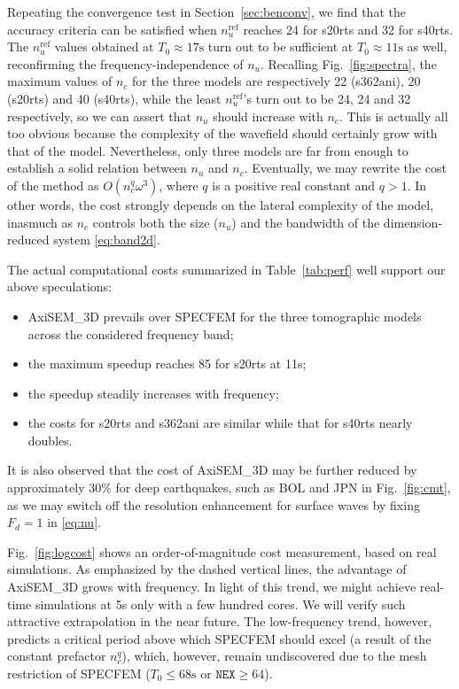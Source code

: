 \documentclass[extra,referee]{gji}
\begin{document}
Repeating the convergence test in Section~\ref{sec:benconv},
we find that the accuracy criteria can be satisfied when 
$n_u^\text{ref}$ reaches 24 for s20rts and 32 for s40rts.
The $n_u^\text{ref}$ values obtained at $T_0\approx17\text{s}$ turn out to be 
sufficient at $T_0\approx11\text{s}$ as well, reconfirming the 
frequency-independence of $n_u$.
Recalling Fig.~\ref{fig:spectra},
the maximum values of $n_c$ for the three models are respectively 
22 (s362ani), 20 (s20rts) and 40 (s40rts), while
the least $n_u^\text{ref}$'s turn out to be 24, 24 and 32 respectively,
so we can assert that $n_u$ should increase with $n_c$. 
This is actually all too obvious
because the complexity of the wavefield should certainly
grow with that of the model.
Nevertheless, only three models are far from enough to establish 
a solid relation between $n_u$ and $n_c$.
Eventually, we may rewrite the cost of the method as 
$O\left(n_c^q \omega^3\right)$, where $q$ is a positive real constant and $q>1$. 
In other words, the cost strongly depends on the lateral complexity 
of the model, inasmuch as $n_c$ controls both the size ($n_u$) and the 
bandwidth of the dimension-reduced system \eqref{eq:band2d}. 

The actual computational costs summarized in Table~\ref{tab:perf}
well support our above speculations:
\begin{itemize}
\item AxiSEM\_3D prevails over SPECFEM for the three tomographic models 
across the considered frequency band;
\item the maximum speedup reaches 85 for s20rts at 11s;
\item the speedup steadily increases with frequency;  
\item the costs for s20rts and s362ani are similar while that for s40rts 
nearly doubles.
\end{itemize}
It is also observed that the cost of AxiSEM\_3D may be further reduced by 
approximately 30\% for deep earthquakes, 
such as BOL and JPN in Fig.~\ref{fig:cmt}, 
as we may switch off the resolution enhancement for surface waves 
by fixing $F_d=1$ in \eqref{eq:nu}.

Fig.~\ref{fig:logcost} shows an order-of-magnitude cost measurement, 
based on real simulations. 
As emphasized by the dashed vertical lines,
the advantage of AxiSEM\_3D grows with frequency. 
In light of this trend, we might achieve real-time simulations at 5s
only with a few hundred cores. We will verify such 
attractive extrapolation in the near future.
The low-frequency trend, however, predicts a critical period above which 
SPECFEM should excel (a result of the constant prefactor $n_c^q$), 
which, however, remain undiscovered due to the mesh restriction
of SPECFEM ($T_0 \le 68\text{s}$ or $\mathtt{NEX} \ge 64$).
\end{document}
